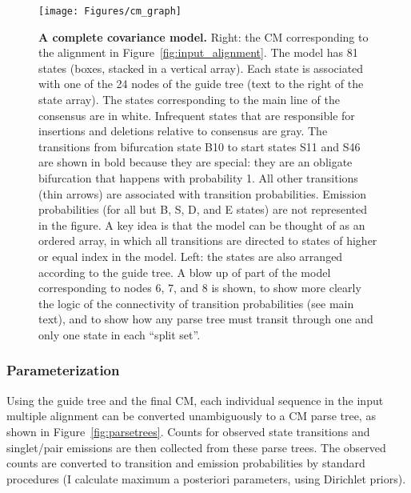 \documentclass[11pt]{article}
\begin{document}
\begin{figure}[tp]
\begin{center}
\texttt{[image: Figures/cm\_graph]}
\end{center}
\caption{\textbf{A complete covariance model.} Right: the CM
corresponding to the alignment in Figure~\ref{fig:input_alignment}.
The model has 81 states (boxes, stacked in a vertical array). Each
state is associated with one of the 24 nodes of the guide tree (text
to the right of the state array). The states corresponding to the main
line of the consensus are in white. Infrequent states that are
responsible for insertions and deletions relative to consensus are
gray. The transitions from bifurcation state B10 to start states S11
and S46 are shown in bold because they are special: they are an
obligate bifurcation that happens with probability 1. All other
transitions (thin arrows) are associated with transition
probabilities.  Emission probabilities (for all but B, S, D, and E
states) are not represented in the figure. A key idea is that the
model can be thought of as an ordered array, in which all transitions
are directed to states of higher or equal index in the model. Left:
the states are also arranged according to the guide tree. A blow up of
part of the model corresponding to nodes 6, 7, and 8 is shown, to show
more clearly the logic of the connectivity of transition probabilities
(see main text), and to show how any parse tree must transit through
one and only one state in each ``split set''.}
\label{fig:cm_graph}
\end{figure}

\subsubsection{Parameterization}

Using the guide tree and the final CM, each individual sequence in the
input multiple alignment can be converted unambiguously to a CM parse
tree, as shown in Figure~\ref{fig:parsetrees}. Counts for observed
state transitions and singlet/pair emissions are then collected from
these parse trees. The observed counts are converted to transition and
emission probabilities by standard procedures (I calculate maximum a
posteriori parameters, using Dirichlet priors).
\end{document}
